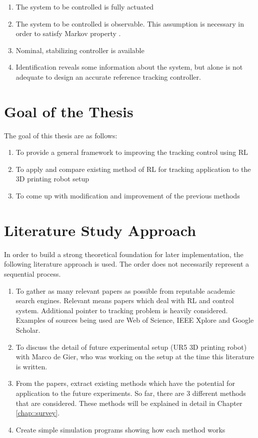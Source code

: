 \begin{enumerate}
	\item The system to be controlled is fully actuated
	\item The system to be controlled is observable. This assumption is necessary in order to satisfy Markov property \cite{sutton1998reinforcement}.
	\item Nominal, stabilizing controller is available	
	\item Identification reveals some information about the system, but alone is not adequate to design an accurate reference tracking controller.
\end{enumerate}

\section{Goal of the Thesis}

The goal of this thesis are as follows:
\begin{enumerate}
\item To provide a general framework to improving the tracking control using \ac{RL}
\item To apply and compare existing method of \ac{RL} for tracking application to the 3D printing robot setup
\item To come up with modification and improvement of the previous methods
\end{enumerate}

\section{Literature Study Approach}
In order to build a strong theoretical foundation for later implementation, the following literature approach is used. The order does not necessarily represent a sequential process.
\begin{enumerate}
	\item To gather as many relevant papers as possible from reputable academic search engines. Relevant means papers which deal with \ac{RL} and control system. Additional pointer to tracking problem is heavily considered. Examples of sources being used are Web of Science, IEEE Xplore and Google Scholar.
	\item To discuss the detail of future experimental setup (UR5 \ac{3D} printing robot) with Marco de Gier, who was working on the setup at the time this literature is written.
	\item From the papers, extract existing methods which have the potential for application to the future experiments. So far, there are 3 different methods that are considered. These methods will be explained in detail in Chapter \ref{chap::survey}.
	\item Create simple simulation programs showing how each method works
	
\end{enumerate}


